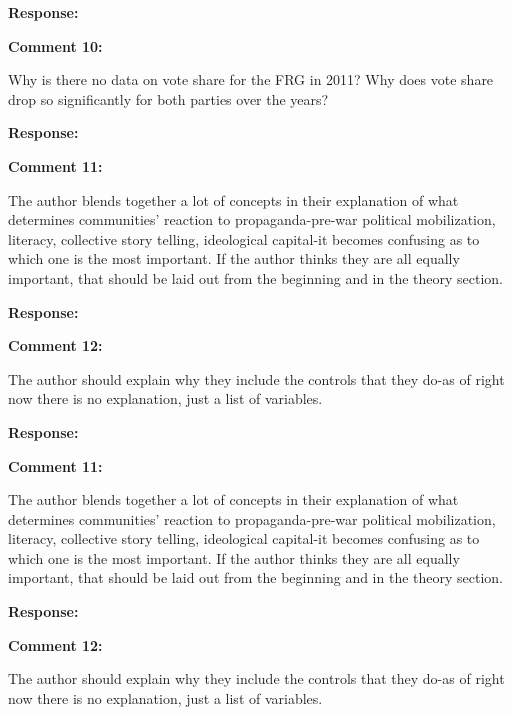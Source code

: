 \documentclass[12pt, a4paper, notitlepage]{article}
\begin{document}
\noindent\textbf{Response:}



\vspace{15pt}
\noindent\textbf{Comment 10:}
\begin{displayquote}
Why is there no data on vote share for the FRG in 2011? Why does vote share drop so significantly for both parties over the years?
\end{displayquote}

\noindent\textbf{Response:}

\vspace{15pt}
\noindent\textbf{Comment 11:}
\begin{displayquote}
The author blends together a lot of concepts in their explanation of what determines communities' reaction to propaganda-pre-war political mobilization, literacy, collective story telling, ideological capital-it becomes confusing as to which one is the most important. If the author thinks they are all equally important, that should be laid out from the beginning and in the theory section.
\end{displayquote}

\noindent\textbf{Response:}

\vspace{15pt}
\noindent\textbf{Comment 12:}
\begin{displayquote}
The author should explain why they include the controls that they do-as of right now there is no explanation, just a list of variables.
\end{displayquote}

\noindent\textbf{Response:}

\vspace{15pt}
\noindent\textbf{Comment 11:}
\begin{displayquote}
The author blends together a lot of concepts in their explanation of what determines communities' reaction to propaganda-pre-war political mobilization, literacy, collective story telling, ideological capital-it becomes confusing as to which one is the most important. If the author thinks they are all equally important, that should be laid out from the beginning and in the theory section.
\end{displayquote}

\noindent\textbf{Response:}



\vspace{15pt}
\noindent\textbf{Comment 12:}
\begin{displayquote}
The author should explain why they include the controls that they do-as of right now there is no explanation, just a list of variables.
\end{displayquote}
\end{document}
